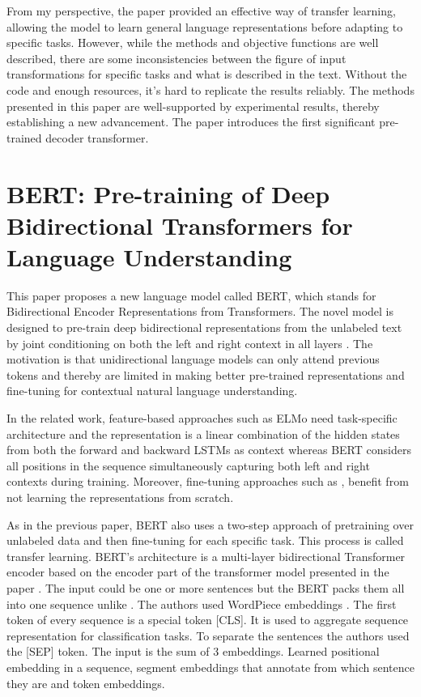 \documentclass[times, utf8, seminar]{fer}
\begin{document}
From my perspective, the paper provided an effective way of transfer learning, allowing the model to learn general language representations before adapting to specific tasks. However, while the methods and objective functions are well described, there are some inconsistencies between the figure of input transformations for specific tasks and what is described in the text. Without the code and enough resources, it's hard to replicate the results reliably. The methods presented in this paper are well-supported by experimental results, thereby establishing a new advancement. The paper introduces the first significant pre-trained decoder transformer. 

\chapter{BERT: Pre-training of Deep Bidirectional Transformers for Language Understanding \citep{devlin2018bert}}
This paper proposes a new language model called BERT, which stands for Bidirectional Encoder Representations from Transformers. The novel model is designed to pre-train deep bidirectional representations from the unlabeled text by joint conditioning on both the left and right context in all layers \citep{devlin2018bert}. The motivation is that unidirectional language models can only attend previous tokens and thereby are limited in making better pre-trained representations and fine-tuning for contextual natural language understanding.


In the related work, feature-based approaches such as ELMo \citep{peters-etal-2018-deep} need task-specific architecture and the representation is a linear combination of the hidden states from both the forward and backward LSTMs as context whereas BERT considers all positions in the sequence simultaneously capturing both left and right contexts during training. Moreover, fine-tuning approaches such as \citep{radford2018improving}, benefit from not learning the representations from scratch.


As in the previous paper, BERT also uses a two-step approach of pretraining over unlabeled data and then fine-tuning for each specific task. This process is called transfer learning. BERT's architecture is a multi-layer bidirectional Transformer encoder based on the encoder part of the transformer model presented in the paper \citep{vaswani2017attention}. The input could be one or more sentences but the BERT packs them all into one sequence unlike \citep{radford2018improving}. The authors used WordPiece embeddings \citep{wu2016google}. The first token of every sequence is a special token [CLS]. It is used to aggregate sequence representation for classification tasks. To separate the sentences the authors used the [SEP] token. The input is the sum of 3 embeddings. Learned positional embedding in a sequence, segment embeddings that annotate from which sentence they are and token embeddings.
\end{document}

